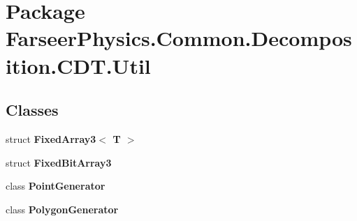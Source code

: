 \hypertarget{namespace_farseer_physics_1_1_common_1_1_decomposition_1_1_c_d_t_1_1_util}{\section{Package Farseer\+Physics.\+Common.\+Decomposition.\+C\+D\+T.\+Util}
\label{namespace_farseer_physics_1_1_common_1_1_decomposition_1_1_c_d_t_1_1_util}
}
\subsection*{Classes}
\begin{DoxyCompactItemize}
\item 
struct {\bfseries Fixed\+Array3$<$ T $>$}
\item 
struct {\bfseries Fixed\+Bit\+Array3}
\item 
class {\bfseries Point\+Generator}
\item 
class {\bfseries Polygon\+Generator}
\end{DoxyCompactItemize}
